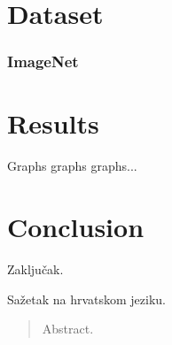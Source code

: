 \documentclass[times, utf8, diplomski]{fer}
\begin{document}
\chapter{Dataset}
\subsection{ImageNet}

\chapter{Results}
Graphs graphs graphs...

\chapter{Conclusion}
Zaključak.





\begin{sazetak}
Sažetak na hrvatskom jeziku.

\end{sazetak}

\begin{abstract}
Abstract.

\end{abstract}
\end{document}
